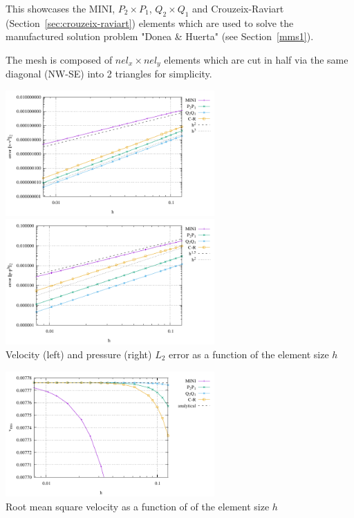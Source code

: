 
This \stone showcases the MINI, $P_2\times P_1$, $Q_2\times Q_1$ and Crouzeix-Raviart  (Section~\ref{sec:crouzeix-raviart})
elements which are used to solve the manufactured solution problem "Donea \& Huerta" (see Section~\ref{mms1}).

The mesh is composed of $nel_x \times nel_y$ elements which are cut in half via the same diagonal (NW-SE) into 2 triangles
for simplicity.

\begin{center}
\includegraphics[width=8cm]{python_codes/fieldstone_112/results/errors_V.pdf}
\includegraphics[width=8cm]{python_codes/fieldstone_112/results/errors_P.pdf}\\
{\captionfont Velocity (left) and pressure (right) $L_2$ error as a function of the element size $h$}
\end{center}

\begin{center}
\includegraphics[width=8cm]{python_codes/fieldstone_112/results/vrms.pdf}\\
{\captionfont Root mean square velocity as a function of of the element size $h$}
\end{center}


